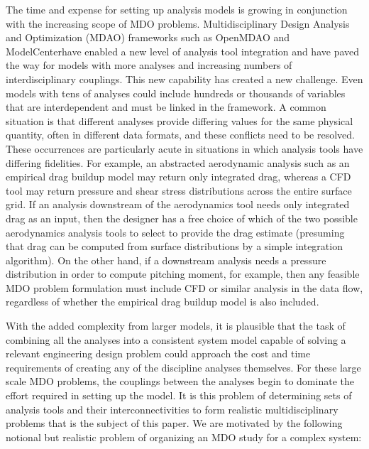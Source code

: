     The time and expense for setting up 
    analysis models is growing in conjunction with the increasing scope of MDO problems. 
    Multidisciplinary Design Analysis and Optimization (MDAO)
    frameworks such as OpenMDAO \cite{Gray2012} and {ModelCenter}\textregistered have enabled a new level of analysis tool integration 
    and have paved the way for models with more analyses and increasing numbers of interdisciplinary couplings. This 
    new capability has created a new challenge. Even models with tens of analyses could include hundreds or thousands
    of variables that are interdependent and must be linked in the framework. 
    A common situation is that different analyses provide differing values for the 
    same physical quantity, often in different data formats, and these conflicts need to be resolved. 
   These occurrences are particularly acute in situations in which analysis tools have differing fidelities. For
    example, an abstracted aerodynamic analysis such as an empirical drag buildup model may return only
    integrated drag, whereas a CFD tool may return pressure and shear stress distributions across the entire
    surface grid. If an analysis downstream of the aerodynamics tool needs only integrated drag as an input,
    then the designer has a free choice of which of the two possible aerodynamics analysis tools to select to
    provide the drag estimate (presuming that drag can be computed from surface distributions by a simple
    integration algorithm). On the other hand, if a downstream analysis needs a pressure distribution in
    order to compute pitching moment, for example, then any feasible MDO problem formulation must
    include CFD or similar analysis in the data flow, regardless of whether the empirical drag buildup model
    is also included.

    With the added complexity from larger models, it is plausible that the task of combining all the analyses into a 
    consistent system model capable of solving a relevant engineering design 
    problem could approach the cost and time requirements of creating any of the discipline 
    analyses themselves. For these large scale MDO problems, the couplings between the 
    analyses begin to dominate the effort required in setting up the model. It is this problem of 
    determining sets of analysis tools and their interconnectivities to form realistic
    multidisciplinary problems that is the subject of this paper. We are motivated by the following notional
    but realistic problem of organizing an MDO study for a complex system:

